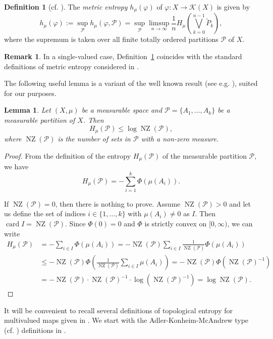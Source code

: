 \documentclass[12pt]{amsart}
\newtheorem{lemma}{Lemma}
\theoremstyle{definition}
\newtheorem{remark}{Remark}
\newtheorem{definition}{Definition}
\newcommand{\K}{\mathcal{K}}
\newcommand{\card}{\operatorname{card}}
\renewcommand{\P}{{\mathcal{P}}}
\newcommand{\vp}{\varphi}
\newcommand{\NZ}{\operatorname{NZ}}
\begin{document}
\begin{definition}[cf. {\cite[Definition 2.1]{VS}}]\label{d:3}
The \emph{metric entropy} $h_\mu(\vp)$ of $\vp:X\to\K(X)$ is given by
\[
h_\mu(\vp) := \sup_{\P} h_\mu(\vp,\P) = \sup_{\P} \limsup_{n\to\infty} \frac1{n} H_\mu(\bigvee_{k=0}^{n-1} \tilde{P}_k),
\]
where the supremum is taken over all finite totally ordered partitions $\P$ of $X$.
\end{definition}

\begin{remark}
In a single-valued case, Definition~\ref{d:3} coincides with the standard definitions of metric entropy considered in \cite{Di,Go1,Go3,Mi,Wa}.
\end{remark}


The following useful lemma is a variant of the well known result (see e.g. \cite[Corollary 4.2.1]{Wa}), suited for our purposes.

\begin{lemma}\label{l:1}
Let $(X,\mu)$ be a measurable space and $\P=\{A_1,\ldots,A_k\}$ be a measurable partition of $X$. Then
\[
H_{\mu}(\P) \leq \log \NZ(\P),
\]
where $\NZ(\P)$ is the number of sets in $\P$ with a non-zero measure.
\end{lemma}
\begin{proof}
From the definition of the entropy $H_{\mu}(\P)$ of the measurable partition $\P$, we have
\[
H_{\mu}(\P) = -\sum_{i=1}^{k} \Phi(\mu(A_i)).
\]

If $\NZ(\P)=0$, then there is nothing to prove. Assume $\NZ(\P)>0$ and
let us define the set of indices $i\in\{1,\ldots,k\}$ with $\mu(A_i)\neq 0$ as $I$. Then $\card I = \NZ(\P)$. Since $\Phi(0)=0$ and $\Phi$ is strictly convex on $[0,\infty)$, we can write
\begin{align*}
H_{\mu}(\P) &= -\sum_{i\in I} \Phi(\mu(A_i)) = 
-\NZ(\P) \sum_{i\in I} \frac1{\NZ(\P)}\Phi(\mu(A_i)) \\
&\leq -\NZ(\P) \Phi\left(\frac1{\NZ(\P)} \sum_{i\in I} \mu(A_i)\right) = -\NZ(\P) \Phi(\NZ(\P)^{-1}) \\
&= -\NZ(\P)\cdot\NZ(\P)^{-1}\cdot \log(\NZ(\P)^{-1}) = \log \NZ(\P). 
\end{align*}
\end{proof}


It will be convenient to recall several definitions of topological entropy for multivalued maps given in \cite{An,AL1,AL2,AL3,CMM1,KT}. We start with the Adler-Konheim-McAndrew type (cf. \cite{AKM}) definitions in \cite{An,AL1}.
\end{document}
